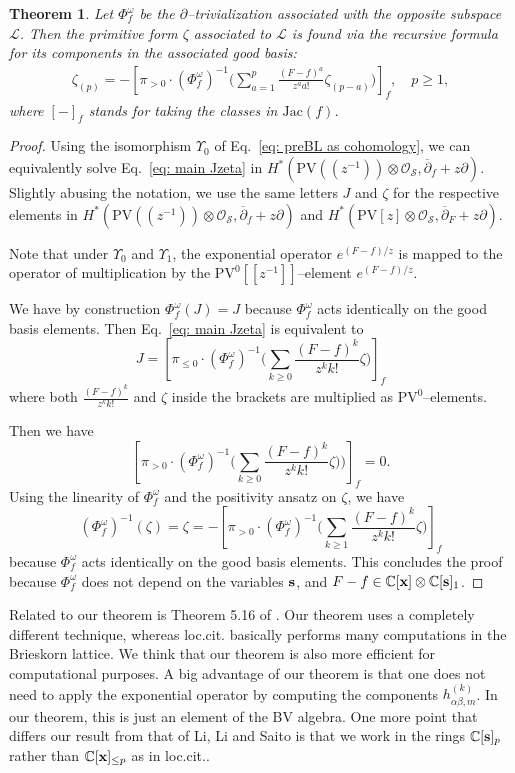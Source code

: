 \documentclass[12pt,a4paper]{amsart}
\newcommand{\CC}{{\mathbb{C}}}
\newcommand{\Jac}{\mathrm{Jac}}
\newcommand{\bx}{{\bf x}}
\def\L{{\mathcal L}}
\def\O{{\mathcal O}}
\renewcommand{\S}{{\mathcal S}}
\newcommand{\p}{{\partial}}
\newcommand{\<}{\left<}
\renewcommand{\>}{\right>}
\newcommand{\bs}{{\bf s}}
\newcommand{\PV}{{\mathrm{PV}}}
\newtheorem{theorem}{Theorem}[section]
\numberwithin{equation}{section}
\begin{document}
\begin{theorem}\label{theorem: primitive form}
Let $\Phi_f^\omega$ be the $\p$--trivialization associated with the opposite subspace $\L$.
Then the primitive form $\zeta$ associated to $\L$ is found via the recursive formula for its components in the associated good basis:
\begin{align}
    \zeta_{(p)} = - \left[ \pi_{>0} \cdot (\Phi_f^\omega)^{-1} \Big( \sum_{a=1}^p \frac{(F-f)^a}{z^a a!} \zeta_{(p-a)}  \Big) \right]_f, \quad p \ge 1,
\end{align}
where $[-]_f$ stands for taking the classes in $\Jac(f)$.
\end{theorem}
\begin{proof}
    Using the isomorphism $\Upsilon_0$ of Eq.~\ref{eq: preBL as cohomology}, we can equivalently solve Eq.~\eqref{eq: main Jzeta} in $H^\ast(\PV((z^{-1})) \otimes \O_\S,\overline\p_f + z\p)$.
    Slightly abusing the notation, we use the same letters $J$ and $\zeta$ for the respective elements in $H^\ast(\PV((z^{-1})) \otimes \O_\S,\overline\p_f + z\p)$ and $H^\ast(\PV [z] \otimes \O_\S,\overline\p_F + z\p)$.

    Note that under $\Upsilon_0$ and $\Upsilon_1$, the exponential operator $e^{(F-f)/z}$ is mapped to the operator of multiplication by the $\PV^0[[z^{-1}]]$--element $e^{(F-f)/z}$.

    We have by construction $\Phi_f^\omega(J) = J$ because $\Phi_f^\omega$ acts identically on the good basis elements.
    Then Eq.~\eqref{eq: main Jzeta} is equivalent to
    \[
        J = \left[ \pi_{\le 0} \cdot (\Phi_f^\omega)^{-1} \Big( \sum_{k \ge 0} \frac{(F-f)^k}{z^k k!} \zeta \Big)  \right]_f
    \]
    where both $\frac{(F-f)^k}{z^k k!}$ and $\zeta$ inside the brackets are multiplied as $\PV^0$--elements.

    Then we have
    \[
        \left[ \pi_{> 0} \cdot (\Phi_f^\omega)^{-1} \Big( \sum_{k \ge 0} \frac{(F-f)^k}{z^k k!} \zeta \Big) ) \right]_f = 0.
    \]
    Using the linearity of $\Phi_f^\omega$ and the positivity ansatz on $\zeta$, we have
    \[
        (\Phi_f^\omega)^{-1} (\zeta) = \zeta = - \left[ \pi_{>0} \cdot (\Phi_f^\omega)^{-1} \Big( \sum_{k \ge 1} \frac{(F-f)^k}{z^k k!} \zeta \Big) \right]_f
    \]
    because $\Phi_f^\omega$ acts identically on the good basis elements. This concludes the proof because $\Phi_f^\omega$ does not depend on the variables $\bs$, and $F-f \in \CC[\bx] \otimes \CC[\bs]_1$.
\end{proof}
 
Related to our theorem is Theorem 5.16 of \cite{LLS}. Our theorem uses a completely different technique, whereas loc.cit. basically performs many computations in the Brieskorn lattice. We think that our theorem is also more efficient for computational purposes. A big advantage of our theorem is that one does not need to apply the exponential operator by computing the components $h^{(k)}_{\alpha\beta,m}$. In our theorem, this is just an element of the BV algebra. One more point that differs our result from that of Li, Li and Saito is that we work in the rings $\CC[\bs]_p$ rather than $\CC[\bx]_{\le p}$ as in loc.cit..
\end{document}
